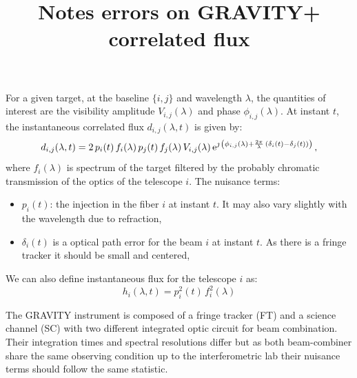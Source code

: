 \documentclass[a4paper,11pt,twoside]{scrartcl}
\title{Notes errors on GRAVITY+ correlated flux}
\begin{document}
\maketitle

For a given target, at the baseline $\{i,j\}$ and wavelength $\lambda$, the quantities of interest are the visibility amplitude $V_{i,j}(\lambda)$ and phase $ \phi_{i,j}(\lambda)$. At instant $t$, the instantaneous correlated flux $d_{i,j}(\lambda,t) $ is given by:
\begin{equation}
	d_{i,j}(\lambda,t) =  2\,p_{i}(t)\,f_{i}(\lambda)\,p_{j}(t)\,f_{j}(\lambda) \, V_{i,j}(\lambda) \,\E^{\jmath \, \left(\phi_{i,j}(\lambda) + \frac{2\pi}{\lambda}\, (\delta_{i}(t) - \delta_{j}(t))\right)} \,,%
\end{equation}
where $f_{i}(\lambda)$ is spectrum of the target filtered by the probably chromatic transmission of the optics of the telescope $i$. The nuisance terms:
\begin{itemize}
	\item $p_{i}(t)$: the injection in the fiber $i$ at instant $t$. It may also vary slightly with the wavelength due to refraction,
	\item $\delta_{i}(t)$ is a optical path error for the beam $i$ at instant $t$. As there is a fringe tracker it should be small and centered,
\end{itemize}

We can also define instantaneous flux for the telescope $i$ as:
\begin{equation}
	h_i(\lambda,t) =  p^2_{i}(t)\,f^2_{i}(\lambda)
\end{equation}
 
The GRAVITY instrument is composed of a fringe tracker (FT) and a science channel (SC) with two different integrated optic circuit for beam combination. Their integration times and spectral resolutions differ but as both beam-combiner share the same observing condition up to the interferometric lab their nuisance terms should follow the same statistic.
\end{document}

